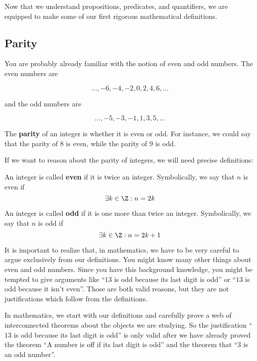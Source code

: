 Now that we understand propositions, predicates, and quantifiers, we are equipped to make some of our first rigorous mathematical definitions.

\subsection{Parity}
You are probably already familiar with the notion of even and odd numbers.   The even numbers are 

$$
\dots, -6, -4, -2, 0 , 2, 4, 6,  \dots
$$

and the odd numbers are 

$$
\dots,  -5, -3, -1, 1, 3, 5, \dots
$$

The \textbf{parity} of an integer is whether it is even or odd.  For instance, we could say that the parity of 8 is even, while the parity of 9 is odd.

If we want to reason about the parity of integers, we will need precise definitions:

\medskip

\begin{definition}
	
	An integer is called \textbf{even} if it is twice an integer. Symbolically, we say that $n$ is even if $$\exists k \in \Z: n=2k$$
\end{definition}

\begin{definition}
	
	An integer is called \textbf{odd} if it is one more than twice an integer. Symbolically, we say that $n$ is odd if $$\exists k \in \Z: n=2k+1$$
\end{definition}

It is important to realize that, in mathematics, we have to be very careful to argue exclusively from our definitions.  You might know many other things about even and odd numbers.  Since you have this background knowledge, you might be tempted to give arguments like ``$13$ is odd because its last digit is odd'' or ``$13$ is odd because it isn't even''.  Those are both valid reasons, but they are not justifications which follow from the definitions.

In mathematics, we start with our definitions and carefully prove a web of interconnected theorems about the objects we are studying.  So the justification ``$13$ is odd because its last digit is odd'' is only valid after we have already proved the theorem ``A number is off if its last digit is odd'' and the theorem that ``$3$ is an odd number''.

